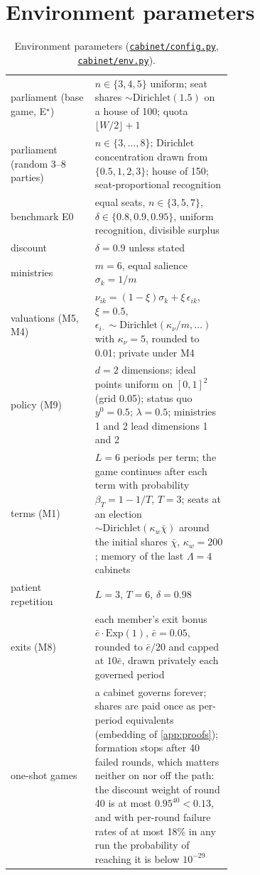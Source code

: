 \documentclass[11pt,a4paper]{article}
\newcommand{\repo}{https://github.com/bot2048/cabinet-bargaining-marl}
\newcommand{\code}[1]{\href{\repo/blob/main/#1}{\texttt{\small #1}}}
\begin{document}
\section{Environment parameters}\label{app:params}
\begin{table}[H]\centering\footnotesize
\caption{Environment parameters (\code{cabinet/config.py}, \code{cabinet/env.py}).}\label{tab:params}
\begin{tabular}{@{}lp{0.62\linewidth}@{}}\toprule
parliament (base game, E$^\star$) & $n\in\{3,4,5\}$ uniform; seat shares $\sim\mathrm{Dirichlet}(1.5)$ on a
house of 100; quota $\lfloor W/2\rfloor+1$\\
parliament (random 3--8 parties) & $n\in\{3,\dots,8\}$; Dirichlet concentration drawn from
$\{0.5,1,2,3\}$; house of 150; seat-proportional recognition\\
benchmark E0 & equal seats, $n\in\{3,5,7\}$, $\delta\in\{0.8,0.9,0.95\}$, uniform recognition, divisible surplus\\
discount & $\delta=0.9$ unless stated\\
ministries & $m=6$, equal salience $\sigma_k=1/m$\\
valuations (M5, M4) & $\nu_{ik}=(1-\xi)\sigma_k+\xi\,\epsilon_{ik}$, $\xi=0.5$,
$\epsilon_{i\cdot}\sim\mathrm{Dirichlet}(\kappa_\nu/m,\dots)$ with $\kappa_\nu=5$, rounded to 0.01;
private under M4\\
policy (M9) & $d=2$ dimensions; ideal points uniform on $[0,1]^2$ (grid 0.05); status quo $y^0=0.5$;
$\lambda=0.5$; ministries 1 and 2 lead dimensions 1 and 2\\
terms (M1) & $L=6$ periods per term; the game continues after each term with probability
$\beta_T=1-1/T$, $T=3$; seats at an election $\sim\mathrm{Dirichlet}(\kappa_w\bar\chi)$ around the initial
shares $\bar\chi$, $\kappa_w=200$; memory of the last $\Lambda=4$ cabinets\\
patient repetition & $L=3$, $T=6$, $\delta=0.98$\\
exits (M8) & each member's exit bonus $\bar e\cdot\mathrm{Exp}(1)$, $\bar e=0.05$, rounded to
$\bar e/20$ and capped at $10\bar e$, drawn privately each governed period\\
one-shot games & a cabinet governs forever; shares are paid once as per-period equivalents (embedding of
\cref{app:proofs}); formation stops after 40 failed rounds, which matters neither on nor off the path: the
discount weight of round 40 is at most $0.95^{40}<0.13$, and with per-round failure rates of at most 18\% in any run
the probability of reaching it is below $10^{-29}$\\
\bottomrule\end{tabular}\end{table}
\end{document}
